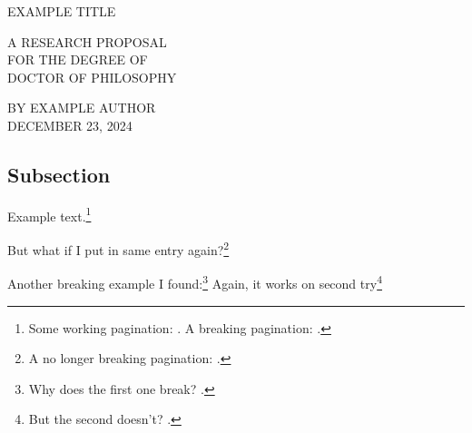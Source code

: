 \documentclass[A4,12pt]{article}
\begin{document}
\hypersetup{pageanchor=false}%
%
\thispagestyle{empty}%
\singlespacing
\begin{center}

  \vfill

  \doublespacing
  \MakeTextUppercase{
    Example Title
  }

  \vfill
  
  \singlespacing
  \MakeTextUppercase{
    A Research Proposal\\
     for the Degree of\\
     Doctor of Philosophy
  }

  \vfill

  \MakeTextUppercase{
    By Example Author\\
    December 23, 2024
  }
  
\end{center}
\restoregeometry
\hypersetup{pageanchor=true}%





\clearpage
{}


%


\subsection{Subsection}

  
Example text.\footnote{
  Some working pagination: \cites[497]{oswaltBookIsaiahChapters1998}[268-269]{kimReadingIsaiahLiterary2016}. 
  A breaking pagination: \cite[51-55]{bakerJubileeMillenniumHoly1998}. %
}

But what if I put in same entry again?\footnote{
  A no longer breaking pagination: \cite[51-55]{bakerJubileeMillenniumHoly1998}. %
} 


Another breaking example I found:\footnote{
  Why does the first one break? \cite[312]{akagiAcceptabilityPurityActs2024}.
}
Again, it works on second try\footnote{
  But the second doesn't? \cite[312]{akagiAcceptabilityPurityActs2024}.
}

\printbibliography[heading=bibintoc]




\end{document}
